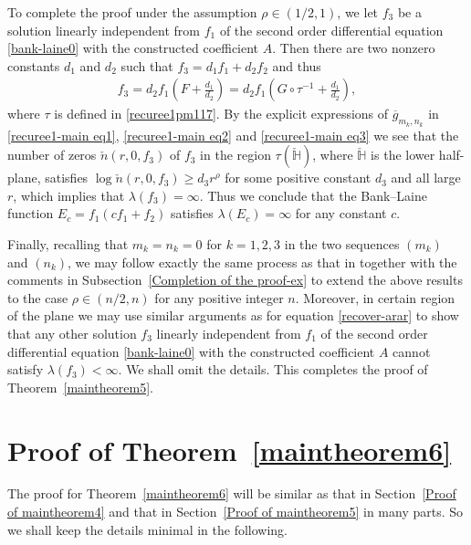 \documentclass[12pt]{amsart}
\numberwithin{equation}{section}
\begin{document}
To complete the proof under the assumption $\rho\in(1/2,1)$, we let $f_3$ be a solution linearly independent from $f_1$ of the second order differential equation \eqref{bank-laine0} with the constructed coefficient $A$. Then there are two nonzero constants $d_1$ and $d_2$ such that $f_3=d_1f_1+d_2f_2$ and thus
\begin{equation}\label{recover-arar}
\begin{split}
f_3=d_2f_1\left(F+\frac{d_1}{d_2}\right)=d_2f_1\left(G\circ\tau^{-1}+\frac{d_1}{d_2}\right),
\end{split}
\end{equation}
where $\tau$ is defined in \eqref{recuree1pm117}. By the explicit expressions of $\overline{g}_{m_k,n_k}$ in \eqref{recuree1-main eq1}, \eqref{recuree1-main eq2} and \eqref{recuree1-main eq3} we see that the number of zeros $\check{n}(r,0,f_3)$ of $f_3$ in the region $\tau(\check{\mathbb{H}})$, where $\check{\mathbb{H}}$ is the lower half-plane, satisfies $\log \check{n}(r,0,f_3)\geq d_3r^{\rho}$ for some positive constant $d_3$ and all large $r$, which implies that $\lambda(f_3)=\infty$. Thus we conclude that the Bank--Laine function $E_c=f_1(cf_1+f_2)$ satisfies $\lambda(E_c)=\infty$ for any constant $c$.

Finally, recalling that $m_k=n_k=0$ for $k=1,2,3$ in the two sequences $(m_k)$ and $(n_k)$, we may follow exactly the same process as that in \cite[Section~5]{Bergweilereremenko2019} together with the comments in Subsection~\ref{Completion of the proof-ex} to extend the above results to the case $\rho\in(n/2,n)$ for any positive integer $n$. Moreover, in certain region of the plane we may use similar arguments as for equation \eqref{recover-arar} to show that any other solution $f_3$ linearly independent from $f_1$ of the second order differential equation \eqref{bank-laine0} with the constructed coefficient $A$ cannot satisfy $\lambda(f_3)<\infty$. We shall omit the details. This completes the proof of Theorem~\ref{maintheorem5}.


\section{Proof of Theorem~\ref{maintheorem6}}\label{Proof of maintheorem6}

The proof for Theorem~\ref{maintheorem6} will be similar as that in Section~\ref{Proof of maintheorem4} and that in Section~\ref{Proof of maintheorem5} in many parts. So we shall keep the details minimal in the following.
\end{document}
